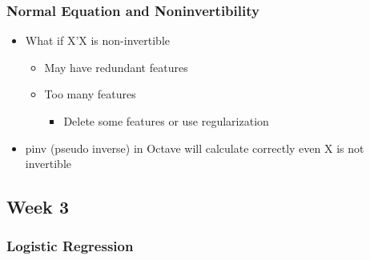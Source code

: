 \documentclass[]{article}
\providecommand{\tightlist}{%
  \setlength{\itemsep}{0pt}\setlength{\parskip}{0pt}}
\begin{document}
\hypertarget{normal-equation-and-noninvertibility}{%
\subsubsection{Normal Equation and
Noninvertibility}\label{normal-equation-and-noninvertibility}}

\begin{itemize}
\tightlist
\item
  What if X'X is non-invertible

  \begin{itemize}
  \tightlist
  \item
    May have redundant features
  \item
    Too many features

    \begin{itemize}
    \tightlist
    \item
      Delete some features or use regularization
    \end{itemize}
  \end{itemize}
\item
  pinv (pseudo inverse) in Octave will calculate correctly even X is not
  invertible
\end{itemize}

\hypertarget{week-3}{%
\subsection{Week 3}\label{week-3}}

\hypertarget{logistic-regression}{%
\subsubsection{Logistic Regression}\label{logistic-regression}}
\end{document}
